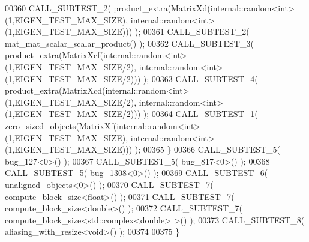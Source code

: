 \begin{DoxyCode}
00360     CALL\_SUBTEST\_2( product\_extra(MatrixXd(internal::random<int>(1,EIGEN\_TEST\_MAX\_SIZE), 
      internal::random<int>(1,EIGEN\_TEST\_MAX\_SIZE))) );
00361     CALL\_SUBTEST\_2( mat\_mat\_scalar\_scalar\_product() );
00362     CALL\_SUBTEST\_3( product\_extra(MatrixXcf(internal::random<int>(1,EIGEN\_TEST\_MAX\_SIZE/2), 
      internal::random<int>(1,EIGEN\_TEST\_MAX\_SIZE/2))) );
00363     CALL\_SUBTEST\_4( product\_extra(MatrixXcd(internal::random<int>(1,EIGEN\_TEST\_MAX\_SIZE/2), 
      internal::random<int>(1,EIGEN\_TEST\_MAX\_SIZE/2))) );
00364     CALL\_SUBTEST\_1( zero\_sized\_objects(MatrixXf(internal::random<int>(1,EIGEN\_TEST\_MAX\_SIZE), 
      internal::random<int>(1,EIGEN\_TEST\_MAX\_SIZE))) );
00365   \}
00366   CALL\_SUBTEST\_5( bug\_127<0>() );
00367   CALL\_SUBTEST\_5( bug\_817<0>() );
00368   CALL\_SUBTEST\_5( bug\_1308<0>() );
00369   CALL\_SUBTEST\_6( unaligned\_objects<0>() );
00370   CALL\_SUBTEST\_7( compute\_block\_size<float>() );
00371   CALL\_SUBTEST\_7( compute\_block\_size<double>() );
00372   CALL\_SUBTEST\_7( compute\_block\_size<std::complex<double> >() );
00373   CALL\_SUBTEST\_8( aliasing\_with\_resize<void>() );
00374 
00375 \}
\end{DoxyCode}
